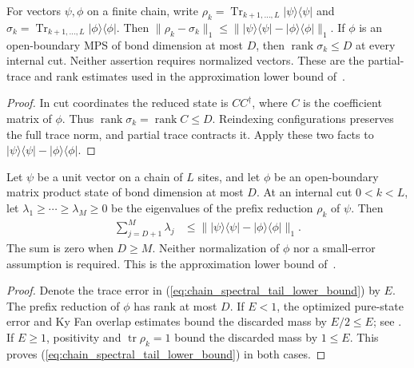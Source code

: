 \begin{lemma}
    \label{thm:chain_reduced_state_rank_error}
    \leanok
    For vectors $\psi,\phi$ on a finite chain, write
    $\rho_k=\operatorname{Tr}_{k+1,\ldots,L}|\psi\rangle\langle\psi|$ and
    $\sigma_k=\operatorname{Tr}_{k+1,\ldots,L}|\phi\rangle\langle\phi|$.
    Then $\|\rho_k-\sigma_k\|_1\le
        \bigl\||\psi\rangle\langle\psi|-|\phi\rangle\langle\phi|\bigr\|_1$.
    If $\phi$ is an open-boundary MPS of bond dimension at most $D$,
    then $\operatorname{rank}\sigma_k\le D$ at every internal cut.
    Neither assertion requires normalized vectors. These are the partial-trace
    and rank estimates used in the approximation lower bound
    of~\cite{Schuch2008EntropyScaling}.
\end{lemma}
\begin{proof}\leanok
    In cut coordinates the reduced state is $CC^\dagger$, where $C$ is
    the coefficient matrix of $\phi$. Thus
    $\operatorname{rank}\sigma_k=\operatorname{rank}C\le D$.
    Reindexing configurations preserves the full trace norm, and partial
    trace contracts it. Apply these two facts to
    $|\psi\rangle\langle\psi|-|\phi\rangle\langle\phi|$.
\end{proof}

\begin{lemma}
    \label{thm:chain_spectral_tail_lower_bound}
    \leanok
    Let $\psi$ be a unit vector on a chain of $L$ sites, and let $\phi$
    be an open-boundary matrix product state of bond dimension at most $D$.
    At an internal cut $0<k<L$, let $\lambda_1\ge\cdots\ge\lambda_M\ge0$
    be the eigenvalues of the prefix reduction $\rho_k$ of $\psi$. Then
    \begin{align}
        \sum_{j=D+1}^{M}\lambda_j
         & \le\bigl\||\psi\rangle\langle\psi|
        -|\phi\rangle\langle\phi|\bigr\|_1.
        \label{eq:chain_spectral_tail_lower_bound}
    \end{align}
    The sum is zero when $D\ge M$. Neither normalization of $\phi$ nor
    a small-error assumption is required. This is the approximation lower
    bound of~\cite[Eq.~(eps-lower), source lines 246--264]{Schuch2008EntropyScaling}.
\end{lemma}
\begin{proof}\leanok
    Denote the trace error in (\ref{eq:chain_spectral_tail_lower_bound}) by $E$.
    The prefix reduction of $\phi$ has rank at most $D$.
    If $E<1$, the optimized pure-state error and Ky Fan overlap estimates
    bound the discarded mass by $E/2\le E$; see
    \cite[``Discarded marginal spectrum at small pure-state error'']{QICLean2026Blueprint}.
    If $E\ge1$, positivity and $\operatorname{tr}\rho_k=1$ bound the
    discarded mass by $1\le E$. This proves
    (\ref{eq:chain_spectral_tail_lower_bound}) in both cases.
\end{proof}

